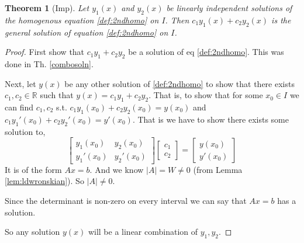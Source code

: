 \documentclass[oneside,11pt,pdftex,final]{book}%
\numberwithin{equation}{section}
\newtheorem{theorem}{Theorem}[chapter]%
\newtheorem{example}[theorem]{Example}
\numberwithin{section}{chapter}
\numberwithin{equation}{chapter}
\newcommand{\R}{\mathbb{R}}
\begin{document}
\begin{theorem}[Imp]
	Let $ y_1(x) $ and $ y_2(x) $ be linearly independent solutions of the homogenous equation \ref{def:2ndhomo} on $ I $. Then $ c_1 y_1(x) + c_2 y_2 (x)$ is the general solution of equation \ref{def:2ndhomo} on $ I $.
\end{theorem}
\begin{proof}
	First show that $ c_1 y_1+c_2y_2 $ be a solution of eq \ref{def:2ndhomo}. This was done in Th. \ref{combosoln}.
	
	 Next, let $ y(x) $ be any other solution of \ref{def:2ndhomo} to show that there exists $ c_1, c_2 \in \R $ such that $ y(x)=c_1y_1+c_2y_2 $. That is, to show that for some $ x_0 \in I $ we can find $ c_1, c_2 $ s.t. $ c_1 y_1(x_0) +c_2y_2(x_0)=y(x_0)$ and $ c_1y_1'(x_0)+c_2y_2'(x_0)=y'(x_0) $.
	That is we have to show there exists some solution to,
	\[ \begin{bmatrix}
	y_1(x_0)	& y_2(x_0)\\ 
	y_1'(x_0)	& y_2'(x_0) 
	\end{bmatrix} \begin{bmatrix}
	c_1 \\ c_2
\end{bmatrix}=\begin{bmatrix}
y(x_0)\\ y'(x_0)
\end{bmatrix} \]
It is of the form $ Ax=b $. And we know $ |A|=W \neq 0$ (from Lemma \ref{lem:ldwronskian}). So $ |A| \neq 0 $. 

Since the determinant is non-zero on every interval we can say that $ Ax=b $ has a solution.

So any solution $ y(x)$ will be a linear combination of $ y_1,y_2 $.
\end{proof}

\end{document}
